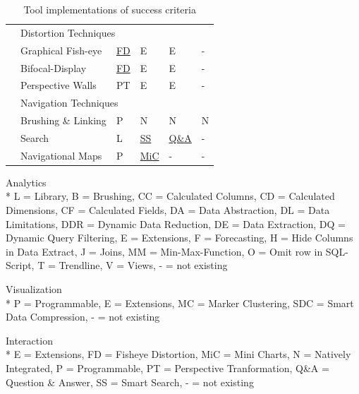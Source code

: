 \begin{table}[H]
\begin{tabular}{|l| l l l l l|}
        & \multicolumn{5}{l|}{\cellcolor{gray!30}Distortion Techniques}\\\cline{2-6}
        & Graphical Fish-eye    & \hyperlink{https://bost.ocks.org/mike/fisheye/}{FD}\cite{Bostock2012}       & E  & E  & - \\
        & Bifocal-Display       & \hyperlink{https://bost.ocks.org/mike/fisheye/}{FD}\cite{Bostock2012}       & E  & E  & - \\
        & Perspective Walls     & PT & E & E & - \\ \cline{2-6}
        
        & \multicolumn{5}{l|}{\cellcolor{gray!30}Navigation Techniques}\\\cline{2-6}
        & Brushing \& Linking   & P & N & N & N \\
        & Search                &  L & \hyperlink{https://help.qlik.com/en-US/sense/2.2/Subsystems/Hub/Content/Search/search-tool.htm}{SS}& \hyperlink{https://powerbi.microsoft.com/en-us/documentation/powerbi-service-q-and-a/}{Q\&A}& - \\
        & Navigational Maps     & P & \hyperlink{https://help.qlik.com/en-US/sense/1.1/Subsystems/Hub/Content/Visualizations/BarChart/BarChart.htm}{MiC}  & -           & -\\
        \hline
    \end{tabular}
    \caption{Tool implementations of success criteria}
    \label{table:features}
    \end{table}
    
    Analytics\\*
    L = Library, B = Brushing, CC = Calculated Columns, CD = Calculated Dimensions, CF = Calculated Fields, DA = Data Abstraction, DL = Data Limitations, DDR = Dynamic Data Reduction, DE = Data Extraction, DQ = Dynamic Query Filtering, E = Extensions, F = Forecasting, H = Hide Columns in Data Extract, J = Joins, MM = Min-Max-Function, O = Omit row in SQL-Script, T = Trendline, V = Views, - = not existing
    \par 
    Visualization\\*
    P = Programmable, E = Extensions, MC = Marker Clustering, SDC = Smart Data Compression, - = not existing
    \par
    Interaction\\*
    E = Extensions, FD = Fisheye Distortion, MiC = Mini Charts, N = Natively Integrated, P = Programmable, PT = Perspective Tranformation, Q\&A = Question \& Answer,  SS = Smart Search, - = not existing

